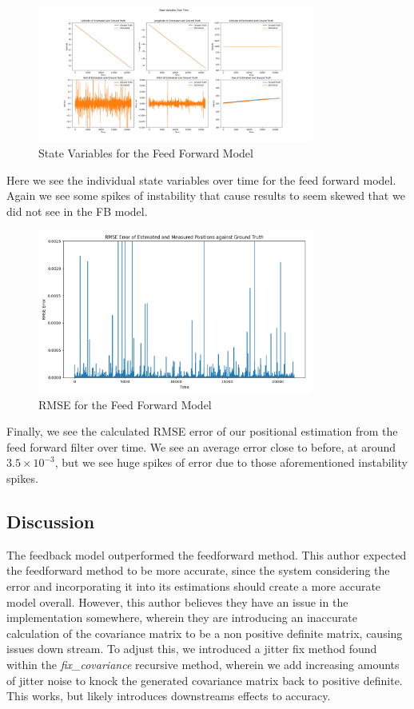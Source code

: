 \documentclass{article}
\begin{document}
\begin{figure}[H]
    \centering
    \includegraphics[width=0.8\textwidth]{./imgs/FF_statevar.png}
    \caption{State Variables for the Feed Forward Model}
\end{figure}

Here we see the individual state variables over time for the feed forward model. Again we see some spikes of instability that cause results to seem skewed that we did not see in the FB model.

\begin{figure}[H]
    \centering
    \includegraphics[width=0.8\textwidth]{./imgs/FF_rmse.png}
    \caption{RMSE for the Feed Forward Model}
\end{figure}

Finally, we see the calculated RMSE error of our positional estimation from the feed forward filter over time. We see an average error close to before, at around $3.5\times10^{-3}$, but we see huge spikes of error due to those aforementioned instability spikes.

\subsection*{Discussion}

The feedback model outperformed the feedforward method. This author expected the feedforward method to be more accurate, since the system considering the error and incorporating it into its estimations should create a more accurate model overall. However, this author believes they have an issue in the implementation somewhere, wherein they are introducing an inaccurate calculation of the covariance matrix to be a non positive definite matrix, causing issues down stream. To adjust this, we introduced a jitter fix method found within the \textit{fix\_covariance} recursive method, wherein we add increasing amounts of jitter noise to knock the generated covariance matrix back to positive definite. This works, but likely introduces downstreams effects to accuracy.
\end{document}
